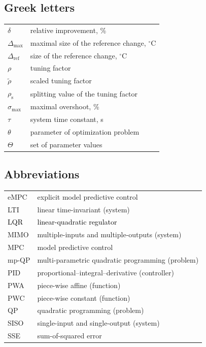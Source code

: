 \documentclass[preprint,12pt]{elsarticle}
\newcommand{\change}[1]{\textcolor{black}{#1}}
\begin{document}
	\subsection{Greek letters}
		\begin{tabular}{ l l }
			$\delta$ & relative improvement, \% \\
			$\Delta_\mathrm{max}$ & maximal size of the reference change, $^{\circ}\mathrm{C}$  \\
			$\Delta_\mathrm{ref}$ & size of the reference change, $^{\circ}\mathrm{C}$ \\
			$\rho$ & tuning factor \\
			$\widetilde{\rho}$ & scaled tuning factor \\
			$\rho_{\mathrm{s}}$ & splitting value of the tuning factor \\
			$\sigma_{\max}$ & maximal overshoot, \% \\
			$\tau$ & system time constant, s\\
			$\theta$ & parameter of optimization problem \\
			$\Theta$ & set of parameter values
		\end{tabular}
	
	\subsection*{Abbreviations}
		\begin{tabular}{ l l }
			eMPC & explicit model predictive control \\			
			LTI  & linear time-invariant (system) \\
			\change{LQR} & \change{linear-quadratic regulator} \\
			MIMO & multiple-inputs and multiple-outputs (system) \\
			MPC  & model predictive control \\
			mp-QP& multi-parametric quadratic programming (problem) \\
			PID  & proportional–integral–derivative (controller) \\
			PWA  & piece-wise affine (function) \\
			PWC  & piece-wise constant (function) \\
			QP   & quadratic programming (problem) \\
			SISO & single-input and single-output (system) \\
			SSE  & sum-of-squared error 
		\end{tabular}
	
\end{document}
